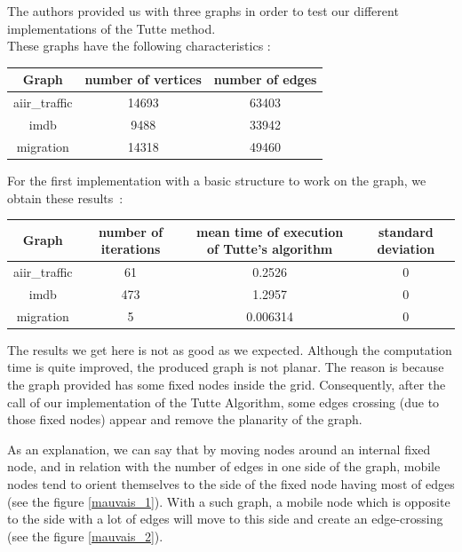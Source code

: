 
The authors provided us with three graphs in order to test our
different implementations of the Tutte method.\\

These graphs have the following characteristics :

\begin{center}
\begin{tabular}{|c|c|c|}
\hline
Graph & number of vertices & number of edges \\
\hline
aiir\_traffic & 14693 & 63403\\
imdb & 9488 & 33942\\
migration & 14318 & 49460\\
\hline
\end{tabular}
\end{center}


For the first implementation with a basic structure to
work on the graph, we obtain these results~:

\begin{center}
\begin{tabular}{|c|c|c|c|}
\hline
Graph & number of iterations & mean time of execution of Tutte's algorithm & standard deviation\\
\hline
aiir\_traffic & 61 & 0.2526 & 0\\
imdb & 473 & 1.2957 & 0\\
migration & 5 & 0.006314 & 0\\
\hline

\end{tabular}
\end{center}

The results we get here is not as good as we expected. Although the
computation time is quite improved, the produced graph is not planar.  The
reason is because the graph provided has some fixed nodes inside the
grid. Consequently, after the call of our implementation of the Tutte
Algorithm, some edges crossing (due to those fixed nodes) appear and remove
the planarity of the graph.

As an explanation, we can say that by moving nodes around an internal fixed
node, and in relation with the number of edges in one side of the graph, mobile
nodes tend to orient themselves to the side of the fixed node having
most of edges (see the figure \ref{mauvais_1}). With a such graph, a
mobile node which is opposite to the side with a lot of edges will move to
this side and create an edge-crossing (see the figure \ref{mauvais_2}).

